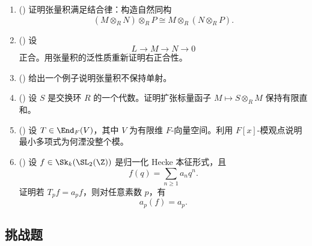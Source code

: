 \begin{enumerate}[label=\textbf{10.\arabic*.}, leftmargin=3.2em, start=26]
  \item (\medium) 证明张量积满足结合律：构造自然同构
  \[
  (M\otimes_R N)\otimes_R P\cong M\otimes_R (N\otimes_R P).
  \]

  \item (\medium) 设
  \[
  L\to M\to N\to 0
  \]
  正合。用张量积的泛性质重新证明右正合性。

  \item (\medium) 给出一个例子说明张量积不保持单射。

  \item (\medium) 设 $S$ 是交换环 $R$ 的一个代数。证明扩张标量函子 $M\mapsto S\otimes_R M$ 保持有限直和。

  \item (\medium) 设 $T\in \End_F(V)$，其中 $V$ 为有限维 $F$-向量空间。利用 $F[x]$-模观点说明最小多项式为何湮没整个模。

  \item (\medium) 设 $f\in \Sk_k(\SL_2(\Z))$ 是归一化 Hecke 本征形式，且
  \[
  f(q)=\sum_{n\ge 1} a_nq^n.
  \]
  证明若 $T_pf=a_pf$，则对任意素数 $p$，有
  \[
  a_p(f)=a_p.
  \]
\end{enumerate}

\subsection*{挑战题}

